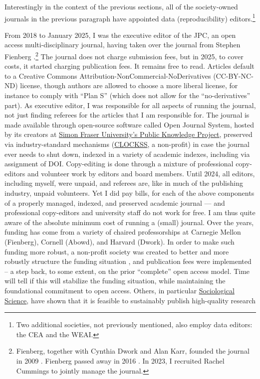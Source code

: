 \documentclass{Revue-economique}
\newcommand{\citep}{\parencite}
\begin{document}
\begin{Article} [%
	Titre={Reproducibility and Open Science in Economics},
	Auteur={Lars Vilhuber\thanks{Cornell University, lars.vilhuber@cornell.edu}}]
\begin{refsection}[Main]
Interestingly in the context of the previous sections, all of the society-owned journals in the previous paragraph have appointed  data (reproducibility) editors.\footnote{Two additional societies, not previously mentioned, also employ data editors: the \ac{CEA} and the \ac{WEAI}. }

From 2018 to January 2025, I was the executive editor of the \ac{JPC}, an open access multi-disciplinary journal, having taken over the journal from Stephen Fienberg \citep{vilhuber_relaunching_2018}.\footnote{Fienberg, together with Cynthia Dwork and Alan Karr, founded the journal in 2009 \citep{abowd_first_2009}. Fienberg passed away in 2016 \citep{slavkovic_remembering_2018}.  In 2023, I recruited Rachel Cummings to jointly manage the journal.} The journal does not charge submission fees, but in 2025, to cover costs, it started charging publication fees. It remains free to read. Articles default to a Creative Commons Attribution-NonCommercial-NoDerivatives (CC-BY-NC-ND) license, though authors are allowed to choose a more liberal license, for instance to comply with ``Plan S'' (which does not allow for the ``no-derivatives'' part). As executive editor, I was responsible for all aspects of running the journal, not just finding referees for the articles that I am responsible for. The journal is made available through open-source software called Open Journal System, hosted by its creators at \href{https://pkp.sfu.ca/hosting-services/hosting/journals/}{Simon Fraser University's Public Knowledge Project}, preserved via industry-standard mechanisms (\href{https://clockss.org/about/how-clockss-works/}{CLOCKSS}, a non-profit) in case the journal ever needs to shut down, indexed in a variety of academic indexes, including via assignment of \acs{DOI}. Copy-editing is done through a mixture of professional copy-editors and volunteer work by editors and board members. Until 2024, all editors, including myself, were unpaid, and referees are, like in much of the publishing industry, unpaid volunteers. Yet I did pay bills, for each of the above components of a properly managed, indexed, and preserved academic journal --- and professional copy-editors and university staff do not work for free. I am thus quite aware of the absolute minimum cost of running a (small) journal. Over the years, funding has come from a variety of chaired professorships at Carnegie Mellon (Fienberg), Cornell (Abowd), and Harvard (Dwork). In order to make such funding more robust, a non-profit society was created to better and more robustly structure the funding situation \citep{abowd_launching_2024}, and publication fees were implemented -- a step back, to some extent, on the prior ``complete'' open access model. Time will tell if this will stabilize the funding situation, while maintaining the foundational commitment to open access. Others, in particular \href{https://sociologicalscience.com/}{Sociological Science}, have shown that it is feasible to sustainably publish high-quality research 



\end{refsection}
\end{Article}
\end{document}
